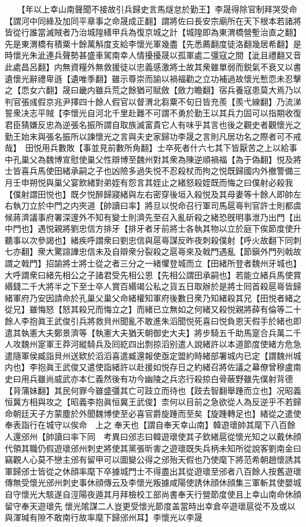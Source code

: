 　　【年以上幸山南聲聞不接故引兵歸史言馬燧怠於勤王】李晟得除官制拜哭受命【謂河中同絳及加同平章事之命晟成正翻】謂將佐曰長安宗廟所在天下根本若諸將皆從行誰當滅賊者乃治城隍繕甲兵為復京城之計【城隍即為東渭橋營塹治直之翻】先是東渭橋有積粟十餘萬斛度支給李懷光軍幾盡【先悉薦翻度徒洛翻幾居希翻】是時懷光朱泚連兵聲勢甚盛車駕南幸人情擾擾晟以孤軍處二彊寇之間【泚且禮翻又音此處昌呂翻】内無資糧外無救援徒以忠義感激將士故其衆雖單弱而鋭氣不衰又以書遺懷光辭禮卑遜【遺唯季翻】雖示尊崇而諭以禍福勸之立功補過故懷光慙恧未忍擊之【恧女六翻】晟曰畿内雖兵荒之餘猶可賦斂【斂力瞻翻】宿兵養寇患莫大焉乃以判官張彧假京兆尹擇四十餘人假官以督渭北芻粟不旬日皆充羨【羨弋線翻】乃流涕誓衆决志平賊【李懷光自河北千里赴難不可謂不勇於勤王以其兵力固可以指期收復君臣猜嫌反忠為逆張名振所謂自取族滅富貴它人有味乎其言也後之觀史者觀懷光之勤王始末與張名振所以諫懷光之言與夫史家歸功李晟之言則凡居功名之際者可不戒哉】　田悦用兵數敗【事並見前數所角翻】士卒死者什六七其下皆厭苦之上以給事中孔巢父為魏博宣慰使巢父性辯博至魏州對其衆為陳逆順禍福【為于偽翻】悦及將士皆喜兵馬使田緒承嗣之子也凶險多過失悦不忍殺杖而拘之悦既歸國内外撤警備三月壬申朔悦與巢父宴飲緒對弟姪有怨言其姪止之緒怒殺姪既而悔之曰僕射必殺我【僕射謂田悦也】既夕悦醉歸寢緒與左右密穿後垣入殺悦及其母妻等十餘人即帥左右執刀立於中門之内夾道【帥讀曰率】將旦以悦命召行軍司馬扈㠋判官許士則都虞候蔣濟議事府署深邃外不知有變士則濟先至召入亂斫殺之緒恐旣明事泄乃出門【出中門也】遇悦親將劉忠信方排牙【排牙者牙前將士各執其物以立於庭下俟節度使升聽事以次參謁也】緒疾呼謂衆曰劉忠信與扈㠋謀反昨夜刺殺僕射【呼火故翻下同刺七亦翻】衆大驚諠譁忠信未及自辯衆分裂殺之扈㠋來及戟門遇亂【節鎭外門列戟故謂之戟門】招諭將士將士從之者三分之一緒懼登城而立【田緒所登者魏州牙城也】大呼謂衆曰緒先相公之子諸君受先相公恩【先相公謂田承嗣也】若能立緒兵馬使賞緡錢二千大將半之下至士卒人賞百緡竭公私之貨五日取辦於是將士囘首殺扈㠋皆歸緒軍府乃安因請命於孔巢父巢父命緒權知軍府後數日衆乃知緒殺其兄【田悦者緒之從兄】雖悔怒【怒其殺兄而悔立之】而緒已立無如之何緒又殺悦親將薛有倫等二十餘人李抱眞王武俊引兵將救貝州聞亂不敢進朱滔聞悦死喜曰悦負恩天假手於緒也即遣其執憲大夫鄭景濟等【執憲大夫猶天朝御史大夫】將步騎五千助馬寔合兵萬二千人攻魏州寔軍王莽河縱騎兵及囘紇四出剽掠滔别遣人說緒許以本道節度使緒方危急遣隨軍侯臧詣貝州送欵於滔滔喜遣臧還報使亟定盟約時緒部署城内已定【謂魏州城内也】李抱眞王武俊又遣使詣緒許以赴援如悦存日之約緒召將佐議之幕僚曾穆盧南史曰用兵雖尚威武亦本仁義然後有功今幽陵之兵恣行殺掠白骨蔽野雖先僕射背德【背蒲妹翻】其民何罪今雖盛彊其亡可跂立而待也【跂去智翻舉踵而立也】况昭義恒冀方相與攻之【昭義李抱眞恒冀王武俊】柰何以目前之急欲從人為反逆乎不若歸命朝廷天子方蒙塵於外聞魏博使至必喜官爵旋踵而至矣【旋踵轉足也】緒從之遣使奉表詣行在城守以俟命　上之奉天也【謂自奉天幸山南】韓遊瓌帥其麾下八百餘人還邠州【帥讀曰率下同　考異曰邠志曰韓遊瓌使其子欽緒扈從懷光知之以戴休顔代領其職仍假遊瓌邠州刺史將使其黨張昕害之遊瓌既失兵柄未知所從說客劉南金曰竊觀人心莫不戀主邠有留甲可以圖變公得之邠殆天假也乃使麾下將范希朝趙懷誘其軍歸邠士皆從之休顔率麾下卒據城門士不得盡出其從遊瓌至邠者八百餘人按舊遊瓌傳無受懷光邠州刺史事休顔傳云及李懷光叛據咸陽使誘休顔休顔集三軍斬其使嬰城自守懷光大駭遂自涇陽夜遁其月拜檢校工部尚書奉天行營節度使且上幸山南命休顔留守奉天遊瓌先懷光隂謀二人豈更受懷光節度盖當時出幸倉卒遊瓌扈從不及或以與渾瑊有隙不敢南行故率麾下歸邠州耳】李懷光以李晟